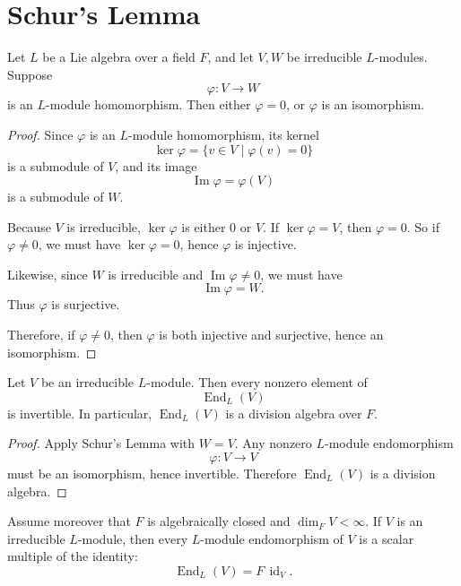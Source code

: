 \section{Schur's Lemma}

\begin{lemma}
    Let $L$ be a Lie algebra over a field $F$, and let $V,W$ be irreducible $L$-modules.
    Suppose
    \[
        \varphi:V\to W
    \]
    is an $L$-module homomorphism. Then either $\varphi=0$, or $\varphi$ is an isomorphism.
\end{lemma}

\begin{proof}
    Since $\varphi$ is an $L$-module homomorphism, its kernel
    \[
        \ker\varphi=\{v\in V\mid \varphi(v)=0\}
    \]
    is a submodule of $V$, and its image
    \[
        \operatorname{Im}\varphi=\varphi(V)
    \]
    is a submodule of $W$.

    Because $V$ is irreducible, $\ker\varphi$ is either $0$ or $V$.
    If $\ker\varphi=V$, then $\varphi=0$.
    So if $\varphi\neq 0$, we must have $\ker\varphi=0$, hence $\varphi$ is injective.

    Likewise, since $W$ is irreducible and $\operatorname{Im}\varphi\neq 0$, we must have
    \[
        \operatorname{Im}\varphi=W.
    \]
    Thus $\varphi$ is surjective.

    Therefore, if $\varphi\neq 0$, then $\varphi$ is both injective and surjective, hence an isomorphism.
\end{proof}

\begin{corollary}
    Let $V$ be an irreducible $L$-module. Then every nonzero element of
    \[
        \operatorname{End}_L(V)
    \]
    is invertible. In particular, $\operatorname{End}_L(V)$ is a division algebra over $F$.
\end{corollary}

\begin{proof}
    Apply Schur's Lemma with $W=V$. Any nonzero $L$-module endomorphism
    \[
        \varphi:V\to V
    \]
    must be an isomorphism, hence invertible.
    Therefore $\operatorname{End}_L(V)$ is a division algebra.
\end{proof}

\begin{corollary}
    Assume moreover that $F$ is algebraically closed and $\dim_F V<\infty$.
    If $V$ is an irreducible $L$-module, then every $L$-module endomorphism of $V$ is a scalar multiple of the identity:
    \[
        \operatorname{End}_L(V)=F\,\operatorname{id}_V.
    \]
\end{corollary}

